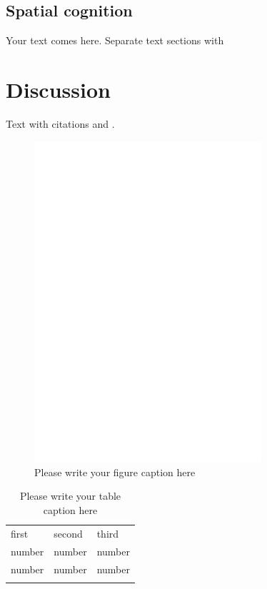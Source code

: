 	\subsection{Spatial cognition}
	\label{sec:3.2}
Your text comes here. Separate text sections with

\section{Discussion}
\label{sec:4}
Text with citations \cite{RefB} and \cite{RefJ}.

%
\begin{figure}
  \includegraphics[width=0.75\textwidth]{bfeed_mob}
\caption{Please write your figure caption here}
\label{fig:2}       %
\end{figure}
%
\begin{table}
\caption{Please write your table caption here}
\label{tab:1}       %
\begin{tabular}{lll}
\hline\noalign{\smallskip}
first & second & third  \\
\noalign{\smallskip}\hline\noalign{\smallskip}
number & number & number \\
number & number & number \\
\noalign{\smallskip}\hline
\end{tabular}
\end{table}


